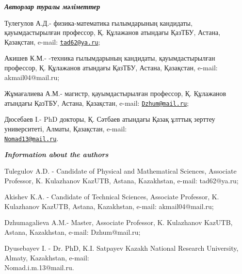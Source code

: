 \begin{authorinfo}
\emph{{\bfseries Авторлар туралы мәліметтер}}

Тулегулов А.Д.- физика-математика ғылымдарының кандидаты,
қауымдастырылған профессор, Қ. Құлажанов атындағы ҚазТБУ, Астана,
Қазақстан, e-mail: \href{mailto:tad62@ya.ru}{\nolinkurl{tad62@ya.ru}};

Акишев К.М.- -техника ғылымдарының кандидаты, қауымдастырылған
профессор, Қ. Құлажанов атындағы ҚазТБУ, Астана, Қазақстан, e-mail:
akmail04@mail.ru;

Жұмағалиева А.М.- магистр, қауымдастырылған профессор, Қ. Құлажанов
атындағы ҚазТБУ, Астана, Қазақстан, e-mail:
\href{mailto:Dzhum@mail.ru}{\nolinkurl{Dzhum@mail.ru}};

Дюсебаев І.- PhD докторы, Қ. Сәтбаев атындағы Қазақ ұлттық зерттеу
университеті, Алматы, Қазақстан, e-mail:\\
\href{mailto:Nomad13@mail.ru}{\nolinkurl{Nomad13@mail.ru}}.

\emph{{\bfseries Information about the authors}}

Tulegulov A.D. - Candidate of Physical and Mathematical Sciences,
Associate Professor, K. Kulazhanov KazUTB, Astana, Kazakhstan, e-mail:
tad62@ya.ru;

Akishev K.A. - Candidate of Technical Sciences, Associate Professor, K.
Kulazhanov KazUTB, Astana, Kazakhstan, e-mail: akmail04@mail.ru;

Dzhumagalieva A.M.- Master, Associate Professor, K. Kulazhanov
KazUTB, Astana, Kazakhstan, e-mail: Dzhum@mail.ru;

Dyusebayev I. - Dr. PhD, K.I. Satpayev Kazakh National Research
University, Almaty, Kazakhstan, e-mail: \\Nomad.i.m.13@mail.ru.
\end{authorinfo}
